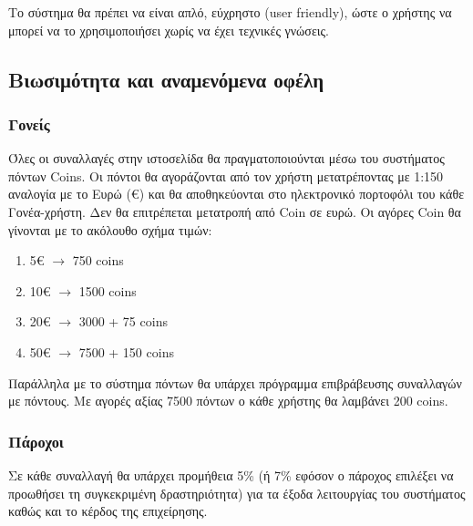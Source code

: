 \documentclass[letterpaper,6pt]{article}
\begin{document}
Το σύστημα θα πρέπει να είναι απλό, εύχρηστο (user friendly), ώστε ο χρήστης να μπορεί να το χρησιμοποιήσει χωρίς να έχει τεχνικές γνώσεις.


\subsection{Βιωσιμότητα και αναμενόμενα οφέλη}

\subsubsection{Γονείς}


Όλες οι συναλλαγές στην ιστοσελίδα θα πραγματοποιούνται μέσω του συστήματος πόντων Coins. Οι πόντοι θα αγοράζονται από τον χρήστη μετατρέποντας με 1:150 αναλογία με το Ευρώ (€) και θα αποθηκεύονται στο ηλεκτρονικό πορτοφόλι του κάθε Γονέα-χρήστη. Δεν θα επιτρέπεται μετατροπή από Coin σε ευρώ. Οι αγόρες Coin θα γίνονται με το ακόλουθο σχήμα τιμών:

\begin{enumerate}
  \item 5€ $\to{}$ 750 coins
  \item 10€ $\to{}$ 1500 coins
  \item 20€ $\to{}$ 3000 + 75 coins
  \item 50€ $\to{}$ 7500 + 150 coins
\end{enumerate}

Παράλληλα με το σύστημα πόντων θα υπάρχει πρόγραμμα επιβράβευσης συναλλαγών με πόντους. Με αγορές αξίας 7500 πόντων ο κάθε χρήστης θα λαμβάνει 200 coins.


\subsubsection{Πάροχοι}

Σε κάθε συναλλαγή θα υπάρχει προμήθεια 5\% (ή 7\% εφόσον ο πάροχος επιλέξει να προωθήσει τη συγκεκριμένη δραστηριότητα) για τα έξοδα λειτουργίας του συστήματος καθώς και το κέρδος της επιχείρησης.
\end{document}
